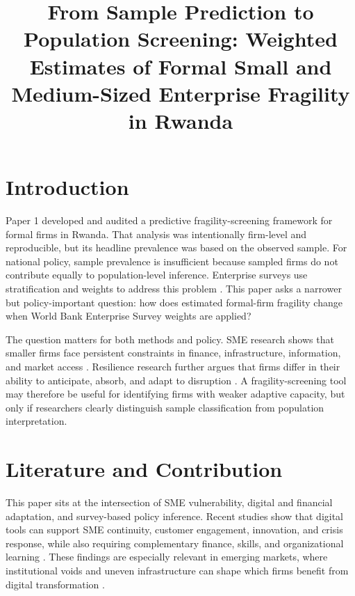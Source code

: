 \documentclass[man,12pt,floatsintext]{apa7}
\title{From Sample Prediction to Population Screening: Weighted Estimates of Formal Small and Medium-Sized Enterprise Fragility in Rwanda}
\let\citep\parencite
\begin{document}
\maketitle

\section{Introduction}

Paper 1 developed and audited a predictive fragility-screening framework for formal firms in Rwanda. That analysis was intentionally firm-level and reproducible, but its headline prevalence was based on the observed sample. For national policy, sample prevalence is insufficient because sampled firms do not contribute equally to population-level inference. Enterprise surveys use stratification and weights to address this problem \citep{worldbank2025rwanda}. This paper asks a narrower but policy-important question: how does estimated formal-firm fragility change when World Bank Enterprise Survey weights are applied?

The question matters for both methods and policy. SME research shows that smaller firms face persistent constraints in finance, infrastructure, information, and market access \citep{ayyagari2007small, beck2006small, amadasun2022finance}. Resilience research further argues that firms differ in their ability to anticipate, absorb, and adapt to disruption \citep{duchek2020organizational, lengnickhall2005adaptive, teece1997dynamic}. A fragility-screening tool may therefore be useful for identifying firms with weaker adaptive capacity, but only if researchers clearly distinguish sample classification from population interpretation.

\section{Literature and Contribution}

This paper sits at the intersection of SME vulnerability, digital and financial adaptation, and survey-based policy inference. Recent studies show that digital tools can support SME continuity, customer engagement, innovation, and crisis response, while also requiring complementary finance, skills, and organizational learning \citep{awad2024digital, guo2020digitalization, lestari2024business, martinrojas2026resilience, mishrif2023technology, papadopoulos2020digital, robertson2022digitalmaturity, sagala2024antifragility, sagala2024toward, sinha2025digitalisation}. These findings are especially relevant in emerging markets, where institutional voids and uneven infrastructure can shape which firms benefit from digital transformation \citep{khanna1997why}.
\end{document}
